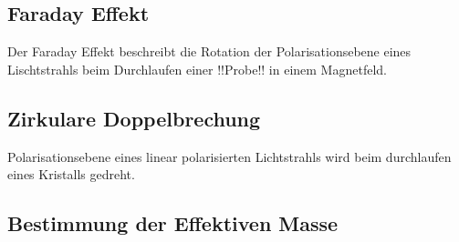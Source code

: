 \subsection{Faraday Effekt}
Der Faraday Effekt beschreibt die Rotation der Polarisationsebene eines Lischtstrahls beim Durchlaufen einer !!Probe!! in einem Magnetfeld.

\subsection{Zirkulare Doppelbrechung}
Polarisationsebene eines linear polarisierten Lichtstrahls wird beim durchlaufen eines Kristalls gedreht.

\subsection{Bestimmung der Effektiven Masse}